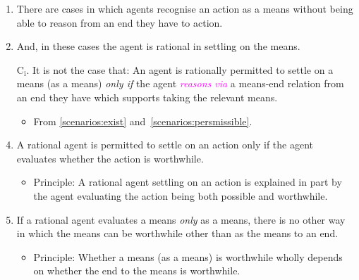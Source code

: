 \documentclass[10pt]{article}
\begin{document}
\begin{enumerate}[label=\arabic*., ref=(\arabic*)]

\item\label{scenarios:exist} There are cases in which agents recognise an action as a means without being able to reason from an end they have to action.

\item\label{scenarios:persmissible} And, in these cases the agent is rational in settling on the means.

\item[C\(_{\text{i}}\).]\label{scenario:no-reasoning} It is not the case that:
  An agent is rationally permitted to settle on a means (as a means)  \emph{only if} the agent \textcolor{fuchsia}{\emph{reasons via}} a means-end relation from an end they have which supports taking the relevant means.

  \begin{itemize}
  \item From \ref{scenarios:exist} and~\ref{scenarios:persmissible}.
  \end{itemize}

\item\label{settle:worthwhile} A rational agent is permitted to settle on an action only if the agent evaluates whether the action is worthwhile.

  \begin{itemize}
  \item Principle: A rational agent settling on an action is explained in part by the agent evaluating the action being both possible and worthwhile.
  \end{itemize}

\item\label{m-e:dependence} If a rational agent evaluates a means \emph{only} as a means, there is no other way in which the means can be worthwhile other than as the means to an end.

  \begin{itemize}
  \item Principle: Whether a means (as a means) is worthwhile wholly depends on whether the end to the means is worthwhile.
  \end{itemize}


\end{enumerate}
\end{document}
